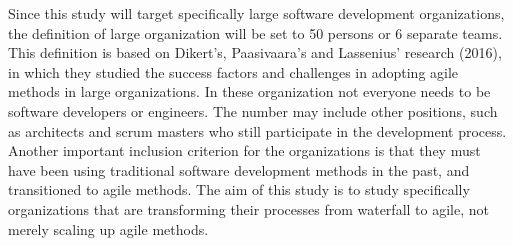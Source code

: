Since this study will target specifically large software development
organizations, the definition of large organization will be set to 50
persons or 6 separate teams. This definition is based on Dikert's,
Paasivaara's and Lassenius' research (2016), in which they studied
the success factors and challenges in adopting agile methods in large
organizations. In these organization not everyone needs to be software
developers or engineers. The number may include other positions, such as
architects and scrum masters who still participate in the development
process. Another important inclusion criterion for the organizations is that
they must have been using traditional software development methods in the past,
and transitioned to agile methods. The aim of this study is to study
specifically organizations that are transforming their processes from waterfall
to agile, not merely scaling up agile methods.
